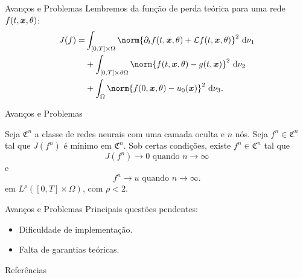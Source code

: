 \documentclass[13pt]{beamer}
\begin{document}
\begin{frame}{Avanços e Problemas}
    Lembremos da função de perda teórica para uma rede \( f ( t, \bm{x}, \theta ) \):
    \begin{align*}
        J ( f ) = &\int_{ [0, T] \times \Omega } \norm{ \partial_{ t } f ( t, \bfx, \theta ) + \mathcal{L} f ( t, \bfx, \theta ) }^2 \ \mathrm{d}\nu_{ 1 } \\
        &+ \int_{ [0, T] \times \partial \Omega } \norm{ f ( t, \bfx, \theta ) - g ( t, \bfx ) }^2 \ \mathrm{d}\nu_{ 2 } \\
        &+ \int_{ \Omega } \norm{ f ( 0, \bfx, \theta ) - u_{ 0 } ( \bfx ) }^2 \ \mathrm{d}\nu_{ 3 }
    .\end{align*}
\end{frame}

\begin{frame}{Avanços e Problemas}
    \begin{teo*}
        Seja \( \mathfrak{C}^{ n } \) a classe de redes neurais com uma camada oculta e \( n \) nós.
        Seja \( f^{ n } \in \mathfrak{C}^n \) tal que \( J ( f^{ n } ) \) é mínimo em \( \mathfrak{C}^{ n } \).
        Sob certas condições, existe \( f^{ n } \in \mathfrak{C}^{ n } \) tal que
        \begin{equation*}
            J ( f^{ n } ) \to 0 \text{ quando } n \to \infty
        \end{equation*}
        e
        \begin{equation*}
            f^{ n } \to u \text{ quando } n \to \infty
        .\end{equation*}
        em \( L^{ \rho } ( [0, T] \times \Omega ) \), com \( \rho < 2 \).
    \end{teo*}
\end{frame}

\begin{frame}{Avanços e Problemas}
    Principais questões pendentes:
    \begin{itemize}
        \item<1-> Dificuldade de implementação.
        \item<2-> Falta de garantias teóricas.
    \end{itemize}
\end{frame}


\begin{frame}[allowframebreaks]{Referências}
    \printbibliography
\end{frame}
\end{document}
